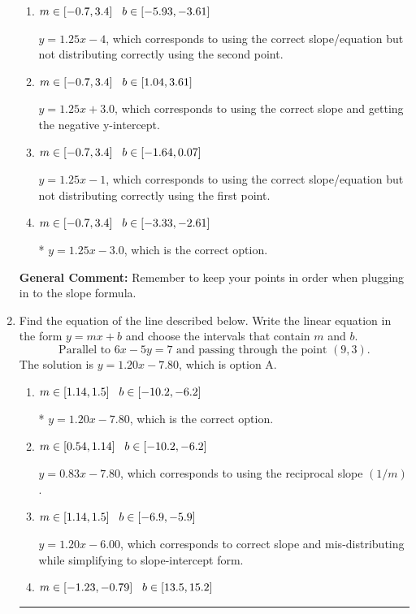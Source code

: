 \documentclass{extbook}[14pt]
\newcommand{\litem}[1]{\item #1

\rule{\textwidth}{0.4pt}}
\begin{document}
\begin{enumerate}
{\begin{enumerate}[label=\Alph*.]
 $y = -1.25x -13.0$, which corresponds to using the negative slope and the correct equation.
\item \( m \in [-0.7, 3.4] \hspace*{3mm} b \in [-5.93, -3.61] \)

 $y = 1.25x -4$, which corresponds to using the correct slope/equation but not distributing correctly using the second point.
\item \( m \in [-0.7, 3.4] \hspace*{3mm} b \in [1.04, 3.61] \)

 $y = 1.25x + 3.0$, which corresponds to using the correct slope and getting the negative y-intercept.
\item \( m \in [-0.7, 3.4] \hspace*{3mm} b \in [-1.64, 0.07] \)

 $y = 1.25x -1$, which corresponds to using the correct slope/equation but not distributing correctly using the first point.
\item \( m \in [-0.7, 3.4] \hspace*{3mm} b \in [-3.33, -2.61] \)

* $y = 1.25x -3.0$, which is the correct option.
\end{enumerate}

\textbf{General Comment:} Remember to keep your points in order when plugging in to the slope formula.
}
\litem{
Find the equation of the line described below. Write the linear equation in the form $ y=mx+b $ and choose the intervals that contain $m$ and $b$.
\[ \text{Parallel to } 6 x - 5 y = 7 \text{ and passing through the point } (9, 3). \]The solution is \( y = 1.20x - 7.80 \), which is option A.\begin{enumerate}[label=\Alph*.]
\item \( m \in [1.14, 1.5] \hspace*{3mm} b \in [-10.2, -6.2] \)

* $y = 1.20x - 7.80$, which is the correct option.
\item \( m \in [0.54, 1.14] \hspace*{3mm} b \in [-10.2, -6.2] \)

 $y = 0.83x - 7.80$, which corresponds to using the reciprocal slope $(1/m)$.
\item \( m \in [1.14, 1.5] \hspace*{3mm} b \in [-6.9, -5.9] \)

 $y = 1.20x - 6.00$, which corresponds to correct slope and mis-distributing while simplifying to slope-intercept form.
\item \( m \in [-1.23, -0.79] \hspace*{3mm} b \in [13.5, 15.2] \)


\end{enumerate}}
\end{enumerate}
\end{document}
